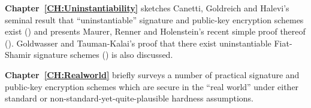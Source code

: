 \medskip\noindent
{\bf Chapter~\ref{CH:Uninstantiability}} sketches Canetti, Goldreich and
Halevi's seminal result that ``uninstantiable'' signature and public-key
encryption schemes exist (\cite{canetti:romfails}) and presents Maurer, Renner
and Holenstein's recent simple proof thereof (\cite{maurer:indiffability}).
Goldwasser and Tauman-Kalai's proof that there exist uninstantiable
Fiat-Shamir signature schemes (\cite{goldwasser:fsparadigmfails}) is also
discussed.

\medskip\noindent
{\bf Chapter~\ref{CH:Realworld}} briefly surveys a number of practical
signature and public-key encryption schemes which are secure in the ``real
world'' under either standard or non-standard-yet-quite-plausible hardness
assumptions.

